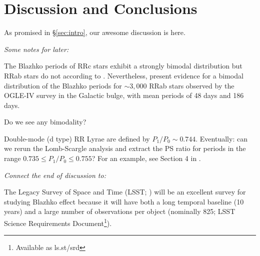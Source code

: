 

\section{Discussion and Conclusions\label{sec:discussion}}

As promised in \S\ref{sec:intro}, our awesome discussion is here.


{\it Some notes for later:}

The Blazhko periods of RRc stars exhibit a strongly bimodal distribution but RRab stars do not
according to  \citep[see][]{2007MNRAS.377.1263S}. Nevertheless, \cite{2020MNRAS.494.1237S}
present evidence for a bimodal distribution of the Blazhko periods for $\sim3,000$ RRab stars
observed by the OGLE-IV survey in the Galactic bulge, with mean periods of 48 days and 186 days.

Do we see any bimodality? 

Double-mode (d type) RR Lyrae are defined by $P_1/P_0 \sim 0.744$.
Eventually: can we rerun the Lomb-Scargle analysis and extract
the PS ratio for periods in the range $0.735 \le P_1/P_0 \le 0.755$?
For an example, see Section 4 in \cite{2007MNRAS.377.1263S}. 


{\it Connect the end of discussion to:}

The Legacy Survey of Space and Time (LSST; \citealt{2019ApJ...873..111I}) will be an excellent survey for studying Blazhko effect
\citep{2022ApJS..258....4H} because it will have both a long temporal
baseline (10 years) and a large number of observations per object
(nominally 825; LSST Science Requirements Document\footnote{Available as ls.st/srd}).




